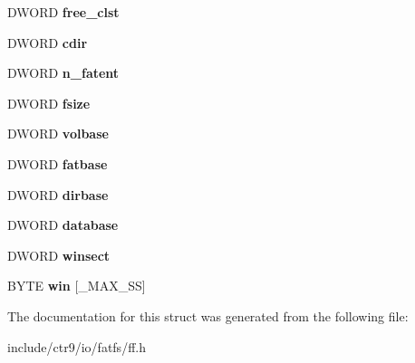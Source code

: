 \begin{DoxyCompactItemize}
\item 
D\+W\+O\+RD {\bfseries free\+\_\+clst}\hypertarget{struct_f_a_t_f_s_ac834248773bf338df807f0d7e6b6a579}{}\label{struct_f_a_t_f_s_ac834248773bf338df807f0d7e6b6a579}

\item 
D\+W\+O\+RD {\bfseries cdir}\hypertarget{struct_f_a_t_f_s_a217d0ce0c8cec84aa7f0c142679412c6}{}\label{struct_f_a_t_f_s_a217d0ce0c8cec84aa7f0c142679412c6}

\item 
D\+W\+O\+RD {\bfseries n\+\_\+fatent}\hypertarget{struct_f_a_t_f_s_a8da50eeba6469bc20d60ca0cf9a1307c}{}\label{struct_f_a_t_f_s_a8da50eeba6469bc20d60ca0cf9a1307c}

\item 
D\+W\+O\+RD {\bfseries fsize}\hypertarget{struct_f_a_t_f_s_a53e9560659f14e66f306c2c444198bf3}{}\label{struct_f_a_t_f_s_a53e9560659f14e66f306c2c444198bf3}

\item 
D\+W\+O\+RD {\bfseries volbase}\hypertarget{struct_f_a_t_f_s_a8f0ca578755749d204f59dc83f1a7649}{}\label{struct_f_a_t_f_s_a8f0ca578755749d204f59dc83f1a7649}

\item 
D\+W\+O\+RD {\bfseries fatbase}\hypertarget{struct_f_a_t_f_s_a848fba02c4aabe02ef2984e578f33d64}{}\label{struct_f_a_t_f_s_a848fba02c4aabe02ef2984e578f33d64}

\item 
D\+W\+O\+RD {\bfseries dirbase}\hypertarget{struct_f_a_t_f_s_a3f72fd998dbcce4652a85a81fe944bc4}{}\label{struct_f_a_t_f_s_a3f72fd998dbcce4652a85a81fe944bc4}

\item 
D\+W\+O\+RD {\bfseries database}\hypertarget{struct_f_a_t_f_s_a5b6c0bc2e9fd2ae8ef714210a74a2d5d}{}\label{struct_f_a_t_f_s_a5b6c0bc2e9fd2ae8ef714210a74a2d5d}

\item 
D\+W\+O\+RD {\bfseries winsect}\hypertarget{struct_f_a_t_f_s_ac60e69c00e6bf7c25febfbac4dc1476b}{}\label{struct_f_a_t_f_s_ac60e69c00e6bf7c25febfbac4dc1476b}

\item 
B\+Y\+TE {\bfseries win} \mbox{[}\+\_\+\+M\+A\+X\+\_\+\+SS\mbox{]}\hypertarget{struct_f_a_t_f_s_a7cc35a593465e727ab87723c14610644}{}\label{struct_f_a_t_f_s_a7cc35a593465e727ab87723c14610644}

\end{DoxyCompactItemize}


The documentation for this struct was generated from the following file\+:\begin{DoxyCompactItemize}
\item 
include/ctr9/io/fatfs/ff.\+h\end{DoxyCompactItemize}
